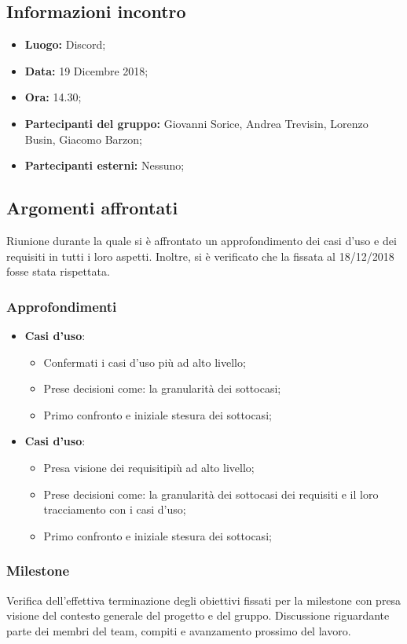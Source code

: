 \subsection{Informazioni incontro}
\begin{itemize}
	\item { \textbf{Luogo:} Discord;  }
	\item { \textbf{Data:} 19 Dicembre 2018; }
	\item { \textbf{Ora:} 14.30; }
	\item { \textbf{Partecipanti del gruppo:} Giovanni Sorice, Andrea Trevisin, Lorenzo Busin, Giacomo Barzon; }
	\item { \textbf{Partecipanti esterni:} Nessuno; }
\end{itemize}


\subsection{Argomenti affrontati}
Riunione durante la quale si è affrontato un approfondimento dei casi d'uso e dei requisiti in tutti i loro aspetti. Inoltre, si è verificato che la  fissata al 18/12/2018 fosse stata rispettata.

\subsubsection{Approfondimenti}
\begin{itemize}
	\item {\textbf{Casi d'uso}}:
	\begin{itemize}
			\item Confermati i casi d'uso più ad alto livello;		
			\item Prese decisioni come: la granularità dei sottocasi;
			\item Primo confronto e iniziale stesura dei sottocasi;
	\end{itemize}
	\item {\textbf{Casi d'uso}}:
	\begin{itemize}
		\item Presa visione dei requisitipiù ad alto livello;		
		\item Prese decisioni come: la granularità dei sottocasi dei requisiti e il loro tracciamento con i casi d'uso;
		\item Primo confronto e iniziale stesura dei sottocasi;
	\end{itemize}
\end{itemize}

\subsubsection{Milestone}
Verifica dell'effettiva terminazione degli obiettivi fissati per la milestone con presa visione del contesto generale del progetto e del gruppo. Discussione riguardante parte dei membri del team, compiti e avanzamento prossimo del lavoro.
